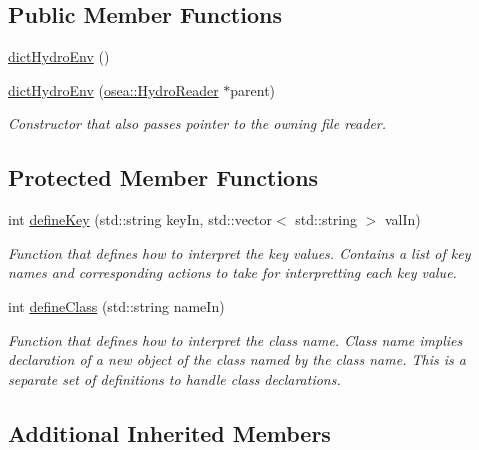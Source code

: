 \subsection*{Public Member Functions}
\begin{DoxyCompactItemize}
\item 
\hyperlink{classosea_1_1dict_hydro_env_a8f275d3b296465202ac2b9163a377be7}{dict\-Hydro\-Env} ()
\item 
\hyperlink{classosea_1_1dict_hydro_env_aa464c5e3cfe3b7d1475e720b99fd7860}{dict\-Hydro\-Env} (\hyperlink{classosea_1_1_hydro_reader}{osea\-::\-Hydro\-Reader} $\ast$parent)
\begin{DoxyCompactList}\small\item\em Constructor that also passes pointer to the owning file reader. \end{DoxyCompactList}\end{DoxyCompactItemize}
\subsection*{Protected Member Functions}
\begin{DoxyCompactItemize}
\item 
int \hyperlink{classosea_1_1dict_hydro_env_a7bcfdbe56cf1f41e3c1b669abc3ec2c7}{define\-Key} (std\-::string key\-In, std\-::vector$<$ std\-::string $>$ val\-In)
\begin{DoxyCompactList}\small\item\em Function that defines how to interpret the key values. Contains a list of key names and corresponding actions to take for interpretting each key value. \end{DoxyCompactList}\item 
int \hyperlink{classosea_1_1dict_hydro_env_aaebcb97fee9e23b8f62a8c1de210338a}{define\-Class} (std\-::string name\-In)
\begin{DoxyCompactList}\small\item\em Function that defines how to interpret the class name. Class name implies declaration of a new object of the class named by the class name. This is a separate set of definitions to handle class declarations. \end{DoxyCompactList}\end{DoxyCompactItemize}
\subsection*{Additional Inherited Members}


